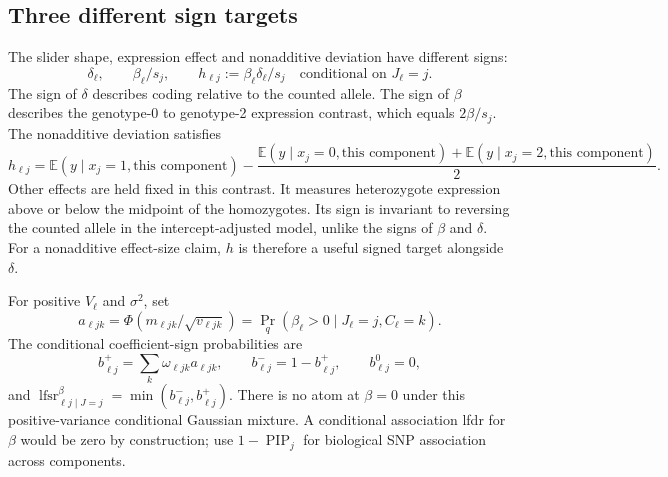 \documentclass[11pt]{article}
\newcommand{\E}{\mathbb E}
\begin{document}
\subsection{Three different sign targets}
\label{sec:sign-targets}
The slider shape, expression effect and nonadditive deviation have different
signs:
\begin{equation}
 \delta_\ell,\qquad \beta_\ell/s_j,\qquad
 h_{\ell j}:=\beta_\ell\delta_\ell/s_j
 \quad\text{conditional on }J_\ell=j.
 \label{eq:sign-targets}
\end{equation}
The sign of $\delta$ describes coding relative to the counted allele.
The sign of $\beta$ describes the genotype-0 to genotype-2 expression
contrast, which equals $2\beta/s_j$. The nonadditive deviation satisfies
\begin{equation}
 h_{\ell j}
 =\E(y\mid x_j=1,\text{this component})
  -\frac{\E(y\mid x_j=0,\text{this component})
          +\E(y\mid x_j=2,\text{this component})}{2}.
 \label{eq:het-deviation}
\end{equation}
Other effects are held fixed in this contrast. It measures heterozygote
expression above or below the midpoint of the homozygotes. Its sign is
invariant to reversing the counted allele in the intercept-adjusted model,
unlike the signs of $\beta$ and $\delta$. For a nonadditive effect-size
claim, $h$ is therefore a useful signed target alongside $\delta$.

For positive $V_\ell$ and $\sigma^2$, set
\begin{equation}
 a_{\ell jk}=\Phi(m_{\ell jk}/\sqrt{v_{\ell jk}})
           =\Pr_q(\beta_\ell>0\mid J_\ell=j,C_\ell=k).
\end{equation}
The conditional coefficient-sign probabilities are
\begin{equation}
 b^+_{\ell j}=\sum_k\omega_{\ell jk}a_{\ell jk},\qquad
 b^-_{\ell j}=1-b^+_{\ell j},\qquad b^0_{\ell j}=0,
\end{equation}
and
$\operatorname{lfsr}^{\beta}_{\ell j\mid J=j}
 =\min(b^-_{\ell j},b^+_{\ell j})$.
There is no atom at $\beta=0$ under this positive-variance conditional
Gaussian mixture. A conditional association lfdr for $\beta$ would be zero
by construction; use $1-\operatorname{PIP}_j$ for biological SNP association
across components.
\end{document}
